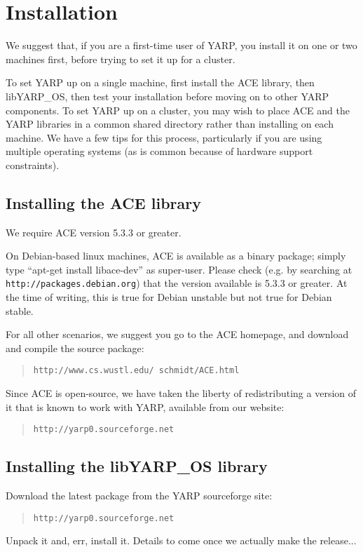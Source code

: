 
\section{Installation}

\label{sect:install}

We suggest that, if you are a first-time user of YARP, you install it
on one or two machines first, before trying to set it up for a cluster.

To set YARP up on a single machine, first install the ACE library,
then libYARP\_OS, then test your installation before moving on to 
other YARP components.  To set YARP up on a cluster, you may 
wish to place ACE and the YARP libraries in a common shared directory
rather than installing on each machine.  We have a few tips for this 
process, particularly if you are using multiple operating systems (as
is common because of hardware support constraints).

\subsection{Installing the ACE library}

We require ACE version 5.3.3 or greater.

On Debian-based linux machines, ACE is available as a binary package;
simply type ``apt-get install libace-dev'' as super-user.  Please
check (e.g. by searching at {\tt http://packages.debian.org}) that the version available is 5.3.3 or greater.  At the time of
writing, this is true for Debian unstable but not true for Debian
stable.

For all other scenarios, we suggest you go to the ACE homepage, and
download and compile the source package:

\begin{quote}
{\tt http://www.cs.wustl.edu/~schmidt/ACE.html}
\end{quote}


Since ACE is open-source, we have taken the liberty of redistributing 
a version of it that is known to work with YARP, available from our 
website:

\begin{quote}
{\tt http://yarp0.sourceforge.net}
\end{quote}




\subsection{Installing the libYARP\_OS library}


Download the latest package from the YARP sourceforge site:

\begin{quote}
{\tt http://yarp0.sourceforge.net}
\end{quote}

Unpack it and, err, install it.  Details to come once we 
actually make the release...

